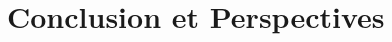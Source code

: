 \documentclass[a4paper,12pt,notitlepage,twoside]{report}
\numberwithin{equation}{section}
\begin{document}



\chapter{Conclusion et Perspectives}


\listoffigures

\listoftables




\end{document}
